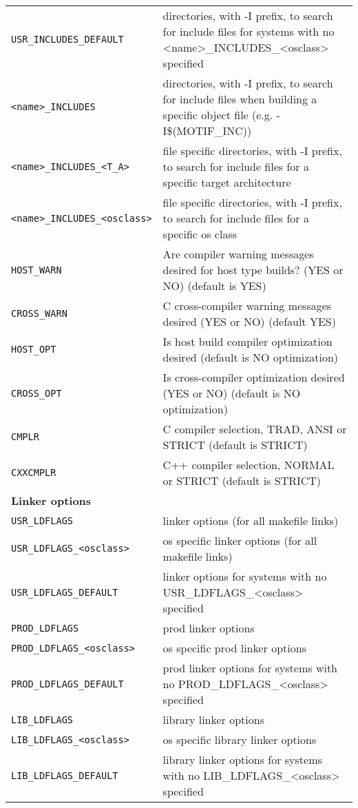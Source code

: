 \begin{center}
\begin{longtable}{p{2.94784in}p{3.76247in}}
\verb|USR_INCLUDES_DEFAULT| & directories, with -I prefix, to search for include files for systems with no \textless{}name\textgreater{}\_INCLUDES\_\textless{}osclass\textgreater{} specified\\
\verb|<name>_INCLUDES| & directories, with -I prefix, to search for include files when building a specific object file (e.g. -I\$(MOTIF\_INC))\\
\verb|<name>_INCLUDES_<T_A>| & file specific directories, with -I prefix, to search for include files for a specific target architecture\\
\verb|<name>_INCLUDES_<osclass>| & file specific directories, with -I prefix, to search for include files for a specific os class\\
\verb|HOST_WARN| & Are compiler warning messages desired for host type builds? (YES or NO) (default is YES)\\
\verb|CROSS_WARN| & C cross-compiler warning messages desired (YES or NO) (default YES)\\
\verb|HOST_OPT| & Is host build compiler optimization desired (default is NO optimization)\\
\verb|CROSS_OPT| & Is cross-compiler optimization desired (YES or NO) (default is NO optimization)\\
\verb|CMPLR| & C compiler selection, TRAD, ANSI or STRICT (default is STRICT)\\
\verb|CXXCMPLR| & C++ compiler selection, NORMAL or STRICT (default is STRICT)\\
\textbf{Linker options} &    \\
\hline
\verb|USR_LDFLAGS| & linker options (for all makefile links)\\
\verb|USR_LDFLAGS_<osclass>| & os specific linker options (for all makefile links)\\
\verb|USR_LDFLAGS_DEFAULT| & linker options for systems with no USR\_LDFLAGS\_\textless{}osclass\textgreater{} specified\\
\verb|PROD_LDFLAGS| & prod linker options\\
\verb|PROD_LDFLAGS_<osclass>| & os specific prod linker options\\
\verb|PROD_LDFLAGS_DEFAULT| & prod linker options for systems with no PROD\_LDFLAGS\_\textless{}osclass\textgreater{} specified\\
\verb|LIB_LDFLAGS| & library linker options\\
\verb|LIB_LDFLAGS_<osclass>| & os specific library linker options\\
\verb|LIB_LDFLAGS_DEFAULT| & library linker options for systems with no LIB\_LDFLAGS\_\textless{}osclass\textgreater{} specified\\

\end{longtable}
\end{center}
